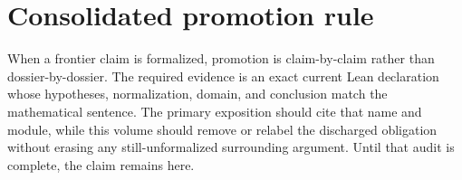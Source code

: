 \documentclass[11pt,oneside]{article}
\theoremstyle{definition}
\theoremstyle{remark}
\begin{document}
\renewcommand{\arraystretch}{1}

\clearpage
\section*{Consolidated promotion rule}
When a frontier claim is formalized, promotion is claim-by-claim rather than
dossier-by-dossier.  The required evidence is an exact current Lean declaration whose
hypotheses, normalization, domain, and conclusion match the mathematical sentence.  The
primary exposition should cite that name and module, while this volume should remove or
relabel the discharged obligation without erasing any still-unformalized surrounding
argument.  Until that audit is complete, the claim remains here.
\end{document}
